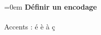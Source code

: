 \documentclass{article}
\begin{document}
\parindent=0em
\textbf{Définir un encodage} \\ \\
Accents : é è à ç
\end{document}
